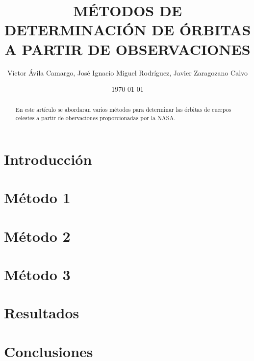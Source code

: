 \documentclass{article}
\title{MÉTODOS DE DETERMINACIÓN DE ÓRBITAS A PARTIR DE OBSERVACIONES}   %
\author{
    Víctor Ávila Camargo, José Ignacio Miguel Rodríguez, Javier Zaragozano Calvo
}
\date{\today}  %
\numberwithin{equation}{section}
\begin{document}
\maketitle
\newpage

\begin{abstract}
    En este artículo se abordaran varios métodos para determinar 
    las órbitas de cuerpos celestes a partir de obervaciones 
proporcionadas por la NASA.
\end{abstract}
\newpage
\section{Introducción} %
\section{Método 1}
\section{Método 2}
\section{Método 3} %
\section{Resultados} %
\section{Conclusiones} %
\end{document}
